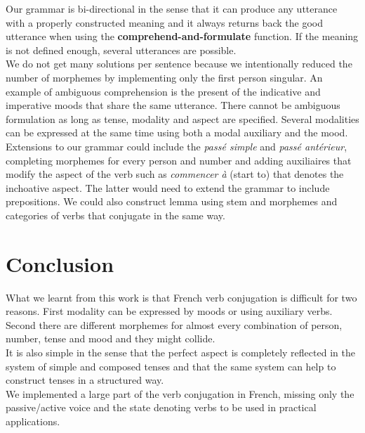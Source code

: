 \documentclass[a4paper,10pt]{article}
\begin{document}
Our grammar is bi-directional in the sense that it can produce any utterance with a properly constructed meaning and it always returns back the good utterance when using the \textbf{comprehend-and-formulate} function. If the meaning is not defined enough, several utterances are possible. \\

We do not get many solutions per sentence because we intentionally reduced the number of morphemes by implementing only the first person singular. An example of ambiguous comprehension is the present of the indicative and imperative moods that share the same utterance. There cannot be ambiguous formulation as long as tense, modality and aspect are specified. Several modalities can be expressed at the same time using both a modal auxiliary and the mood. \\

Extensions to our grammar could include the \textit{passé simple} and \textit{passé antérieur}, completing morphemes for every person and number and adding auxiliaires that modify the aspect of the verb such as \textit{commencer à} (start to) that denotes the inchoative aspect. The latter would need to extend the grammar to include prepositions. We could also construct lemma using stem and morphemes and categories of verbs that conjugate in the same way. \\

\section{Conclusion}

What we learnt from this work is that French verb conjugation is difficult for two reasons. First modality can be expressed by moods or using auxiliary verbs. Second there are different morphemes for almost every combination of person, number, tense and mood and they might collide. \\

It is also simple in the sense that the perfect aspect is completely reflected in the system of simple and composed tenses and that the same system can help to construct tenses in a structured way. \\

We implemented a large part of the verb conjugation in French, missing only the passive/active voice and the state denoting verbs to be used in practical applications.
\end{document}
